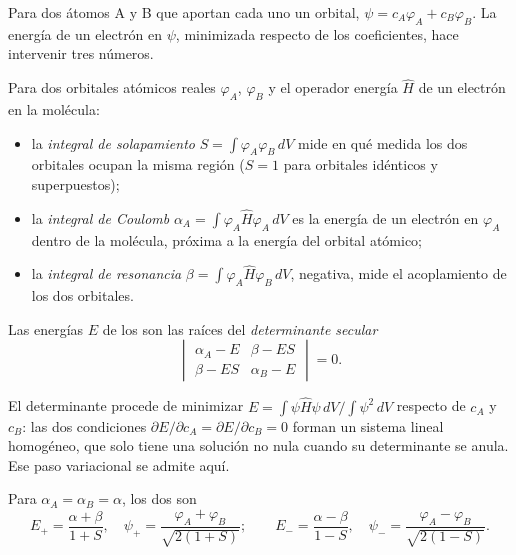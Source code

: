 Para dos átomos A y B que aportan cada uno un orbital, $\psi = c_A\varphi_A + c_B\varphi_B$.
La energía de un electrón en $\psi$, minimizada respecto de los coeficientes,
hace intervenir tres números.

\begin{definition}\label{def:b2:diatomic-mos:integrals}
Para dos orbitales atómicos reales $\varphi_A$, $\varphi_B$ y el operador energía $\hat H$
de un electrón en la molécula:
\begin{itemize}
  \item la \emph{integral de solapamiento} $S = \int\varphi_A\varphi_B\,dV$
        mide en qué medida los dos orbitales ocupan la misma región ($S = 1$ para
        orbitales idénticos y superpuestos);
  \item la \emph{integral de Coulomb} $\alpha_A = \int\varphi_A\hat
        H\varphi_A\,dV$ es la energía de un electrón en $\varphi_A$ dentro de la molécula,
        próxima a la energía del orbital atómico;
  \item la \emph{integral de resonancia} $\beta = \int\varphi_A\hat
        H\varphi_B\,dV$, negativa, mide el acoplamiento de los dos orbitales.
\end{itemize}
Las energías $E$ de los  son las raíces del \emph{determinante
secular}
\[
  \begin{vmatrix} \alpha_A - E & \beta - ES \\ \beta - ES & \alpha_B - E \end{vmatrix} = 0 .
\]
\end{definition}

El determinante procede de minimizar $E = \int\psi\hat H\psi\,dV/\int\psi^2\,dV$
respecto de $c_A$ y $c_B$: las dos condiciones $\partial E/\partial c_A =
\partial E/\partial c_B = 0$ forman un sistema lineal homogéneo, que solo tiene una solución
no nula cuando su determinante se anula. Ese paso variacional se admite
aquí.

\begin{theorem}\label{thm:b2:diatomic-mos:homonuclear}
Para $\alpha_A = \alpha_B = \alpha$, los dos  son
\[
  E_+ = \frac{\alpha + \beta}{1 + S}, \quad \psi_+ = \frac{\varphi_A + \varphi_B}{\sqrt{2(1 + S)}} ;
  \qquad
  E_- = \frac{\alpha - \beta}{1 - S}, \quad \psi_- = \frac{\varphi_A - \varphi_B}{\sqrt{2(1 - S)}} .
\]
\end{theorem}

